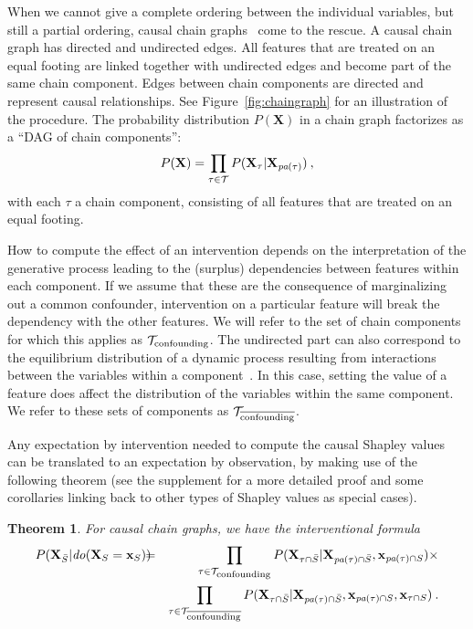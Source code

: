 \documentclass{article}
\newcommand{\vX}{\mathbf{X}}
\newcommand{\vx}{\mathbf{x}}
\newcommand{\dodo}{\mathit{do}}
\newcommand{\lvdo}[1]{\dodo(\vX_{#1} = \vx_{#1})}
\newcommand{\spa}{\mathop{\textit{\scriptsize pa}}}
\newcommand{\onder}[2]{{#1}_{\mbox{\scriptsize #2}}}
\newcommand{\isequal}{\hspace*{-2.5mm} & = & \hspace*{-2.5mm}}
\newcommand{\chaincomponents}{{\cal T}}
\newtheorem{theorem}{Theorem}
\begin{document}
When we cannot give a complete ordering between the individual variables, but still a partial ordering, causal chain graphs~\cite{lauritzen2002chain} come to the rescue. A causal chain graph has directed and undirected edges. All features that are treated on an equal footing are linked together with undirected edges and become part of the same chain component. Edges between chain components are directed and represent causal relationships. See Figure~\ref{fig:chaingraph} for an illustration of the procedure. The probability distribution $P(\vX)$ in a chain graph factorizes as a ``DAG of chain components'':
\[
P(\vX) = \prod_{\tau \in \chaincomponents} P(\vX_\tau|\vX_{\spa(\tau)}) \: ,
\]
with each $\tau$ a chain component, consisting of all features that are treated on an equal footing.

How to compute the effect of an intervention depends on the interpretation of the generative process leading to the (surplus) dependencies between features within each component. If we assume that these are the consequence of marginalizing out a common confounder, intervention on a particular feature will break the dependency with the other features. We will refer to the set of chain components for which this applies as $\onder{\chaincomponents}{confounding}$. The undirected part can also correspond to the equilibrium distribution of a dynamic process resulting from interactions between the variables within a component~\cite{lauritzen2002chain}. In this case, setting the value of a feature does affect the distribution of the variables within the same component. We refer to these sets of components as $\chaincomponents_{\overline{\textrm{\upshape \scriptsize confounding}}}$.

Any expectation by intervention needed to compute the causal Shapley values can be translated to an expectation by observation, by making use of the following theorem (see the supplement for a more detailed proof and some corollaries linking back to other types of Shapley values as special cases).
\begin{theorem}
For causal chain graphs, we have the interventional formula 
\begin{eqnarray}
P(\vX_{\bar{S}}|\lvdo{S}) \isequal \prod_{\tau \in \chaincomponents_{\textrm{\upshape \scriptsize confounding}}} P(\vX_{\tau \cap \bar{S}}|\vX_{\spa(\tau)  \cap \bar{S}},\vx_{\spa(\tau) \cap S}) \times \\ \nonumber
&& \prod_{\tau \in \chaincomponents_{\overline{\textrm{\upshape \scriptsize confounding}}}} P(\vX_{\tau \cap \bar{S}}|\vX_{\spa(\tau) \cap \bar{S}},\vx_{\spa(\tau) \cap S},\vx_{\tau \cap S}) \: .
\label{eq:chaininterventional}
\end{eqnarray}
\end{theorem}
\end{document}
